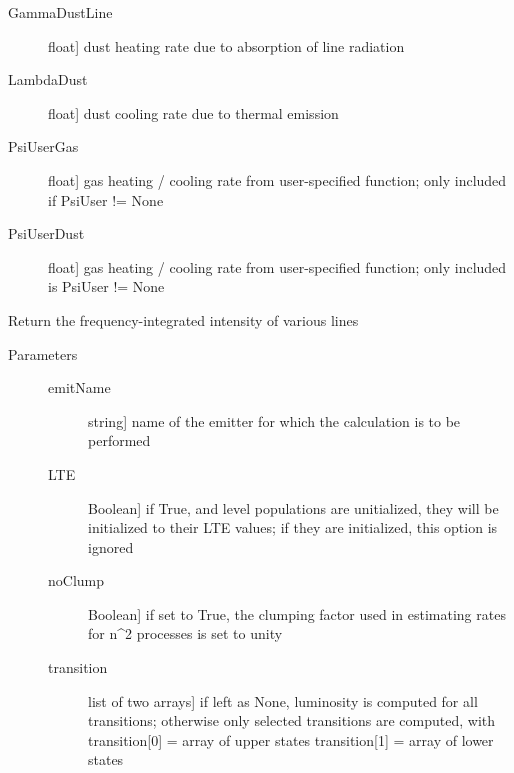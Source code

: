 \documentclass[letterpaper,10pt,english]{sphinxmanual}
\begin{document}
\begin{fulllineitems}
\begin{fulllineitems}
\begin{description}
\begin{description}
\item[{GammaDustLine}] \leavevmode{[}float{]}
dust heating rate due to absorption of line radiation

\item[{LambdaDust}] \leavevmode{[}float{]}
dust cooling rate due to thermal emission

\item[{PsiUserGas}] \leavevmode{[}float{]}
gas heating / cooling rate from user-specified
function; only included if PsiUser != None

\item[{PsiUserDust}] \leavevmode{[}float{]}
gas heating / cooling rate from user-specified
function; only included is PsiUser != None

\end{description}

\end{description}

\end{fulllineitems}


\begin{fulllineitems}
\label{fulldoc:despotic.cloud.lineLum}
Return the frequency-integrated intensity of various lines
\begin{description}
\item[{Parameters}] \leavevmode\begin{description}
\item[{emitName}] \leavevmode{[}string{]}
name of the emitter for which the calculation is to be
performed

\item[{LTE}] \leavevmode{[}Boolean{]}
if True, and level populations are unitialized, they will
be initialized to their LTE values; if they are
initialized, this option is ignored

\item[{noClump}] \leavevmode{[}Boolean{]}
if set to True, the clumping factor used in estimating
rates for n\textasciicircum{}2 processes is set to unity

\item[{transition}] \leavevmode{[}list of two arrays{]}
if left as None, luminosity is computed for all
transitions; otherwise only selected transitions are
computed, with transition{[}0{]} = array of upper states
transition{[}1{]} = array of lower states


\end{description}
\end{description}
\end{fulllineitems}
\end{fulllineitems}
\end{document}
